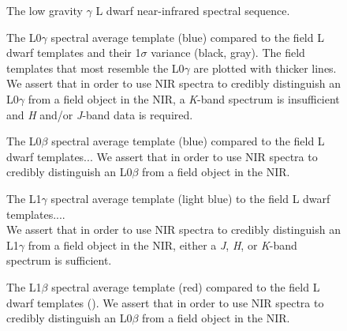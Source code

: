 \documentclass[12pt,preprint]{aastex}
\begin{document}


\begin{figure}
	\caption{The low gravity $\gamma$ L dwarf near-infrared spectral sequence.}
	\label{fig:lg_sequence}
\end{figure}




\begin{figure}
	\caption{The L0$\gamma$ spectral average template (blue) compared to the field L dwarf templates and their 1$\sigma$ variance (black, gray). The field templates that most resemble the L0$\gamma$ are plotted with thicker lines. We assert that in order to use NIR spectra to credibly distinguish an L0$\gamma$ from a field object in the NIR, a \emph{K}-band spectrum is insufficient and \emph{H} and/or \emph{J}-band data is required.}
	\label{fig:L0lg-field}
\end{figure}

\begin{figure}
	\caption{The L0$\beta$ spectral average template (blue) compared to the field L dwarf templates... We assert that in order to use NIR spectra to credibly distinguish an L0$\beta$ from a field object in the NIR.}
	\label{fig:L0b-field}
\end{figure}

\begin{figure}
	\caption{The L1$\gamma$ spectral average template (light blue) to the field L dwarf templates.... \\
	We assert that in order to use NIR spectra to credibly distinguish an L1$\gamma$ from a field object in the NIR, either a \emph{J}, \emph{H}, or \emph{K}-band spectrum is sufficient.}
	\label{fig:L1lg-field}
\end{figure}

\begin{figure}
	\caption{The L1$\beta$ spectral average template (red) compared to the field L dwarf templates (). We assert that in order to use NIR spectra to credibly distinguish an L0$\beta$ from a field object in the NIR.}
	\label{fig:L1b-field}
\end{figure}
\end{document}
